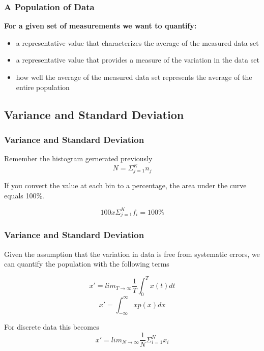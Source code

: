\documentclass[fleqn]{ltx-talk} %
\newcommand{\sectionIIsubsectionItitle}{A Population of Data}
\newcommand{\sectionIIsubsectionIItitle}{Variance and Standard Deviation}
\begin{document}
      \begin{frame}
				\frametitle{\sectionIIsubsectionItitle}

				\textbf{For a given set of measurements  we want to quantify:}
				\begin{itemize}
          
					\item a representative value that characterizes the average of the measured data set
					\item a representative value that provides a measure of the variation in the data set
					\item how well the average of the measured data set represents the average of the entire population
				\end{itemize}

			\end{frame}	

		\subsection{\sectionIIsubsectionIItitle}\label{sectionIIsubsectionII}

			\begin{frame}
				\frametitle{\sectionIIsubsectionIItitle}
        Remember the histogram gernerated previously
        \[ N=\Sigma_{j=1}^Kn_j \]
      
        If you convert the value at each bin to a percentage, the area under the curve equals 100\%.

        \[100x\Sigma_{j=1}^Kf_i=100\% \]

			\end{frame}

			\begin{frame}
				\frametitle{\sectionIIsubsectionIItitle}
        
        Given the assumption that the variation in data is free from systematic errors, we can quantify the population with the following terms

      \[ x' = lim_{T\rightarrow\infty}\frac{1}{T}\int_0^Tx(t)dt  \]
      \[ x' = \int_{-\infty}^\infty xp(x)dx \]
      
       For discrete data this becomes
\[x'= lim_{N\rightarrow\infty}\frac{1}{N}\Sigma_{i=1}^N x_i \]

			\end{frame}
			
\end{document}
